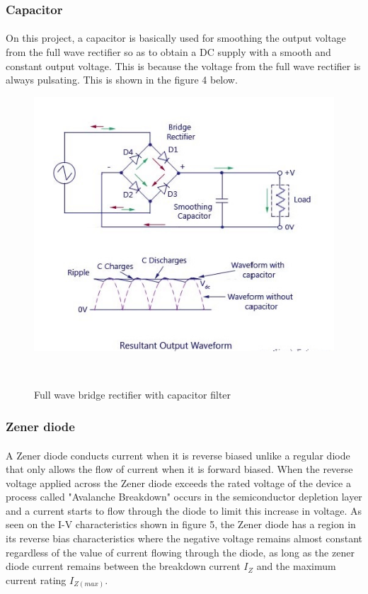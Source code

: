 \documentclass[titlepage]{article}
\begin{document}
\subsubsection{Capacitor}
\paragraph{} On this project, a capacitor is basically  used for smoothing the output voltage from the full wave rectifier so as to obtain a DC supply with a smooth and constant output voltage. This is because the voltage from the full wave rectifier is always pulsating. This is shown in the figure 4 below.

\begin{figure}[h!]
\centering
\includegraphics[scale=0.7]{bridge_rectifier_with_capacitor_filter.jpg}
\caption{Full wave bridge rectifier with capacitor filter}~\cite{Circuitstodaywebsite}
\label{bridge_rectifier_with_capacitor_filter}
\end{figure}

\subsubsection{Zener diode}
\paragraph{} A Zener diode conducts current when it is reverse biased unlike a regular diode that only allows the flow of current when it is forward biased. When the reverse voltage applied across the Zener diode exceeds the rated voltage of the device a process called "Avalanche Breakdown" occurs in the semiconductor depletion layer and a current starts to flow through the diode to limit this increase in voltage. As seen on the I-V characteristics shown in figure 5, the Zener diode has a region in its reverse bias characteristics where the negative voltage remains almost constant regardless of the value of current flowing through the diode, as long as the zener diode current remains between the breakdown current $I_{Z}$ and the maximum current rating $I_{Z(max)}$. 
\end{document}
